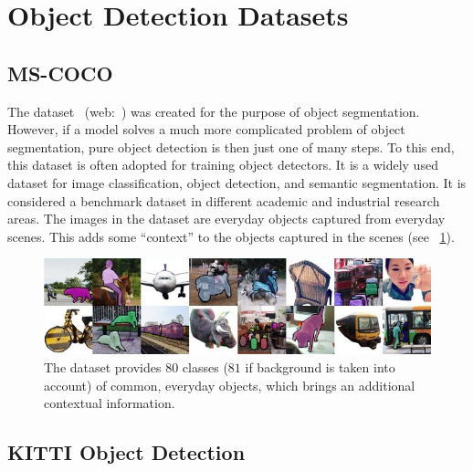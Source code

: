 \section{Object Detection Datasets}
\label{sec:ObjectDetectionDatasets}

\subsection{MS-COCO}
\label{ssec:DatasetMSCOCO}

The \mscoco{} dataset~\cite{lin2014mscoco} (web:~\cite{webmscocodataset}) was created for the purpose of object segmentation. However, if a model solves a much more complicated problem of object segmentation, pure object detection is then just one of many steps. To this end, this dataset is often adopted for training object detectors. It is a widely used dataset for image classification, object detection, and semantic segmentation. It is considered a benchmark dataset in different academic and industrial research areas. The images in the dataset are everyday objects captured from everyday scenes. This adds some “context” to the objects captured in the scenes (see \figstr{}~\ref{fig:MSCOCODataset}).

\begin{figure}[t]
    \centerline{\includegraphics[width=0.9\linewidth]{figures/datasets/ms_coco_sample.jpeg}}
    \caption[\mscoco{} dataset]{The \mscoco{} dataset provides $80$ classes ($81$ if background is taken into account) of common, everyday objects, which brings an additional contextual information. }
    \label{fig:MSCOCODataset}
\end{figure}

\subsection{KITTI Object Detection}
\label{ssec:DatasetKITTIObjectDetection}

